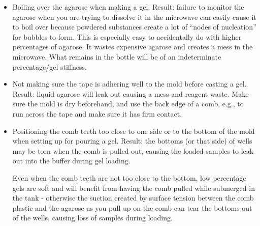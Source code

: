 \documentclass[
  letterpaper,
  DIV=11,
  numbers=noendperiod]{scrreprt}
\begin{document}
\begin{itemize}
\item
  Boiling over the agarose when making a gel. Result: failure to monitor
  the agarose when you are trying to dissolve it in the microwave can
  easily cause it to boil over because powdered substances create a lot
  of ``nodes of nucleation'' for bubbles to form. This is especially
  easy to accidentally do with higher percentages of agarose. It wastes
  expensive agarose and creates a mess in the microwave. What remains in
  the bottle will be of an indeterminate percentage/gel stiffness.
\item
  Not making sure the tape is adhering well to the mold before casting a
  gel. Result: liquid agarose will leak out causing a mess and reagent
  waste. Make sure the mold is dry beforehand, and use the back edge of
  a comb, e.g., to run across the tape and make sure it has firm
  contact.
\item
  Positioning the comb teeth too close to one side or to the bottom of
  the mold when setting up for pouring a gel. Result: the bottoms (or
  that side) of wells may be torn when the comb is pulled out, causing
  the loaded samples to leak out into the buffer during gel loading.

  \begin{tcolorbox}[enhanced jigsaw, toprule=.15mm, breakable, coltitle=black, leftrule=.75mm, title=\textcolor{quarto-callout-important-color}{\faExclamation}\hspace{0.5em}{NOTE}, bottomrule=.15mm, toptitle=1mm, bottomtitle=1mm, colframe=quarto-callout-important-color-frame, opacityback=0, colback=white, opacitybacktitle=0.6, colbacktitle=quarto-callout-important-color!10!white, rightrule=.15mm, titlerule=0mm, arc=.35mm, left=2mm]

  Even when the comb teeth are not too close to the bottom, low
  percentage gels are soft and will benefit from having the comb pulled
  while submerged in the tank - otherwise the suction created by surface
  tension between the comb plastic and the agarose as you pull up on the
  comb can tear the bottoms out of the wells, causing loss of samples
  during loading.


\end{tcolorbox}
\end{itemize}
\end{document}
